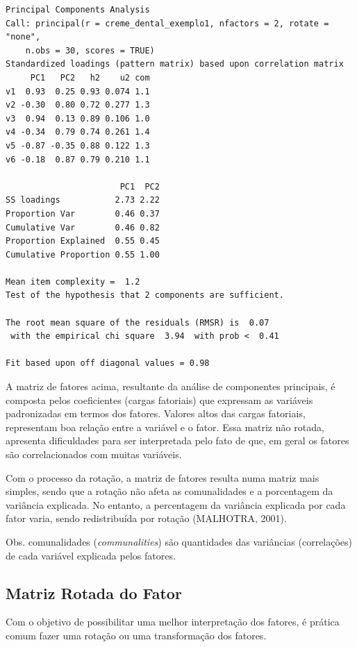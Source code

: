 \documentclass[12pt,brazil,oneside]{book}
\begin{document}
\begin{verbatim}
Principal Components Analysis
Call: principal(r = creme_dental_exemplo1, nfactors = 2, rotate = "none", 
    n.obs = 30, scores = TRUE)
Standardized loadings (pattern matrix) based upon correlation matrix
     PC1   PC2   h2    u2 com
v1  0.93  0.25 0.93 0.074 1.1
v2 -0.30  0.80 0.72 0.277 1.3
v3  0.94  0.13 0.89 0.106 1.0
v4 -0.34  0.79 0.74 0.261 1.4
v5 -0.87 -0.35 0.88 0.122 1.3
v6 -0.18  0.87 0.79 0.210 1.1

                       PC1  PC2
SS loadings           2.73 2.22
Proportion Var        0.46 0.37
Cumulative Var        0.46 0.82
Proportion Explained  0.55 0.45
Cumulative Proportion 0.55 1.00

Mean item complexity =  1.2
Test of the hypothesis that 2 components are sufficient.

The root mean square of the residuals (RMSR) is  0.07 
 with the empirical chi square  3.94  with prob <  0.41 

Fit based upon off diagonal values = 0.98
\end{verbatim}

A matriz de fatores acima, resultante da análise de componentes principais, é composta pelos coeficientes (cargas fatoriais) que expressam as variáveis padronizadas em termos dos fatores.
Valores altos das cargas fatoriais, representam boa relação entre a variável e o fator. Essa matriz não rotada, apresenta dificuldades para ser interpretada pelo fato de que, em geral os fatores são correlacionados com muitas variáveis.

Com o processo da rotação, a matriz de fatores resulta numa matriz mais simples, sendo que a rotação não afeta as comunalidades e a porcentagem da variância explicada. No entanto, a percentagem da variância explicada por cada fator varia, sendo redistribuída por rotação (MALHOTRA, 2001).

Obs. comunalidades (\emph{communalities}) são quantidades das variâncias (correlações) de cada variável explicada pelos fatores.

\hypertarget{matriz-rotada-do-fator}{%
\subsection{Matriz Rotada do Fator}\label{matriz-rotada-do-fator}}

Com o objetivo de possibilitar uma melhor interpretação dos fatores, é prática comum fazer uma rotação ou uma transformação dos fatores.
\end{document}
